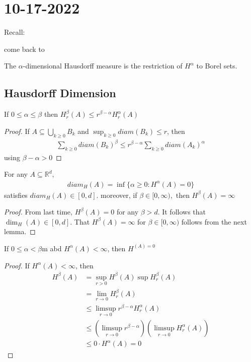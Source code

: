 \section{10-17-2022}


Recall:

come back to

The $\alpha$-dimensional Hausdorff measure is the restriction of $H^{\alpha}$ to Borel sets.

\subsection{Hausdorff Dimension}

\begin{lemma}
	If $0 \leq \alpha \leq \beta$ then $H^{\beta}_r (A) \leq r^{\beta - \alpha} H^{\alpha}_{r} (A)$
\end{lemma}

\begin{proof}
	If $A \subseteq \bigcup_{k \geq 0} B_{k}$ and $\sup_{k \geq 0} diam (B_{k}) \leq r$, 
	then 
	\begin{align*}
		\sum_{k \geq 0} diam (B_{k})^{\beta} \leq r^{\beta - \alpha} \sum_{k \geq 0} diam (A_{k})^{\alpha}
	\end{align*} 
	using $ \beta - \alpha > 0$
\end{proof}

\begin{theorem}
	For any $A \subseteq \mathbb{R}^{d},$ 
	\begin{align*}
		diam_{H}(A) = \inf \{\alpha \geq 0 : H^{\alpha}(A) = 0\}
	\end{align*} 
	satisfies $diam_{H}(A) \in [0, d]$. moreover, if $\beta \in [0, \infty),$ then $H^{\beta}(A) = \infty$
\end{theorem}

\begin{proof}
	From last time, $H^{\beta}(A) = 0$ for any $\beta > d$. It follows that $\dim_{H}(A) \in [0, d]$.
	That $H^{\beta}(A) = \infty$ for $\beta \in [0, \infty)$ follows from the next lemma.
\end{proof}

\begin{lemma}
	If $0 \leq \alpha < \beta$m abd $H^{\alpha}(A) < \infty$, then $H^{(A) = 0}$
\end{lemma}

\begin{proof}
	If $H^{\alpha}(A) < \infty$, then
	\begin{align*}
		H^{\beta} (A) &= \sup_{r > 0} H^{\beta} (A) \sup H_{r}^{\beta} (A) \\
					  &= \lim_{r \to 0} H_{r}^{\beta} (A) \\
					  &\leq \limsup_{r \to 0} r^{\beta - \alpha} H_{r}^{\alpha} (A) \\
					  &\leq ( \limsup_{r \to 0} r^{\beta - \alpha} ) ( \limsup_{r \to 0} H_{r}^{\alpha} (A) ) \\
					  &\leq 0 \cdot H^{\alpha} (A) = 0
	\end{align*}
\end{proof}


